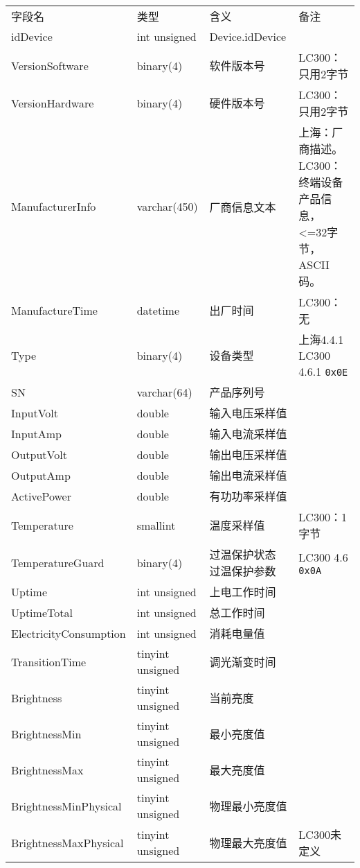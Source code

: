 \begin{longtabu}[c]{@{}lXXX@{}}
\toprule\addlinespace
字段名 & 类型 & 含义 & 备注
\\\addlinespace
\midrule\endhead
idDevice & int unsigned & Device.idDevice &
\\\addlinespace
VersionSoftware & binary(4) & 软件版本号 & LC300：只用2字节
\\\addlinespace
VersionHardware & binary(4) & 硬件版本号 & LC300：只用2字节
\\\addlinespace
ManufacturerInfo & varchar(450) & 厂商信息文本 &
上海：厂商描述。LC300：终端设备产品信息，\textless{}=32字节，ASCII码。
\\\addlinespace
ManufactureTime & datetime & 出厂时间 & LC300：无
\\\addlinespace
Type & binary(4) & 设备类型 & 上海4.4.1 LC300 4.6.1 \texttt{0x0E}
\\\addlinespace
SN & varchar(64) & 产品序列号 &
\\\addlinespace
InputVolt & double & 输入电压采样值 &
\\\addlinespace
InputAmp & double & 输入电流采样值 &
\\\addlinespace
OutputVolt & double & 输出电压采样值 &
\\\addlinespace
OutputAmp & double & 输出电流采样值 &
\\\addlinespace
ActivePower & double & 有功功率采样值 &
\\\addlinespace
Temperature & smallint & 温度采样值 & LC300：1字节
\\\addlinespace
TemperatureGuard & binary(4) & 过温保护状态 过温保护参数 & LC300 4.6
\texttt{0x0A}
\\\addlinespace
Uptime & int unsigned & 上电工作时间 &
\\\addlinespace
UptimeTotal & int unsigned & 总工作时间 &
\\\addlinespace
ElectricityConsumption & int unsigned & 消耗电量值 &
\\\addlinespace
TransitionTime & tinyint unsigned & 调光渐变时间 &
\\\addlinespace
Brightness & tinyint unsigned & 当前亮度 &
\\\addlinespace
BrightnessMin & tinyint unsigned & 最小亮度值 &
\\\addlinespace
BrightnessMax & tinyint unsigned & 最大亮度值 &
\\\addlinespace
BrightnessMinPhysical & tinyint unsigned & 物理最小亮度值 &
\\\addlinespace
BrightnessMaxPhysical & tinyint unsigned & 物理最大亮度值 & LC300未定义

\end{longtabu}
